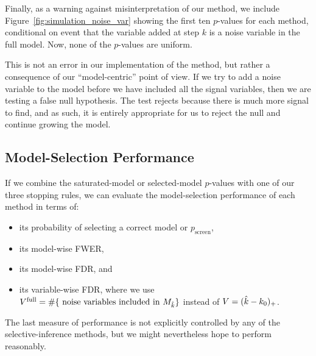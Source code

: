 \documentclass{article}
\begin{document}
Finally, as a warning against misinterpretation of our method, we include Figure~\ref{fig:simulation_noise_var} showing the first ten $p$-values for each method, conditional on event that the variable added at step $k$ is a noise variable in the full model. Now, none of the $p$-values are uniform. 

This is not an error in our implementation of the method, but rather a consequence of our ``model-centric'' point of view. If we try to add a noise variable to the model before we have included all the signal variables, then we are testing a false null hypothesis. The test rejects because there is much more signal to find, and as such, it is entirely appropriate for us to reject the null and continue growing the model.

\subsection{Model-Selection Performance}

If we combine the saturated-model or selected-model $p$-values with one of our three stopping rules, we can evaluate the model-selection performance of each method in terms of:
\begin{itemize}
\item its probability of selecting a correct model or $p_{\text{screen}}$,
\item its model-wise FWER,
\item its model-wise FDR, and
\item its variable-wise FDR, where we use $V^{\text{full}}= \#\{\text{ noise variables included in } M_{\hat{k}}\}$ instead of $V=(\hat{k}-k_0)_+$.
\end{itemize} 
The last measure of performance is not explicitly controlled by any of the selective-inference methods, but we might nevertheless hope to perform reasonably.

\end{document}
